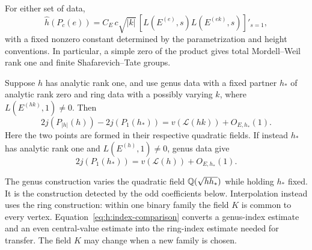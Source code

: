 \begin{proposition}
\label{prop:heegner-comparison}
For either set of data,
\begin{equation}\label{eq:h:height}
 \widehat h(P_c(e))
 =C_E\,c\sqrt{|k|}\,
       \left[L(E^{(e)},s)L(E^{(ek)},s)\right]'_{s=1},
\end{equation}
with a fixed nonzero constant determined by the parametrization and height
conventions. In particular, a simple zero of the product gives total
Mordell--Weil rank one and finite Shafarevich--Tate groups.

Suppose $h$ has analytic rank one, and use genus data with a fixed partner
$h_*$ of analytic rank zero and ring data with a possibly varying $k$,
where $L(E^{(hk)},1)\ne0$. Then
\begin{equation}\label{eq:h:index-comparison}
 2j(P_{|h|}(h))-2j(P_1(h_*))
       =v(\mathcal L(hk))+O_{E,h_*}(1).
\end{equation}
Here the two points are formed in their respective quadratic fields.
If instead $h_*$ has analytic rank one and $L(E^{(h)},1)\ne0$, genus
data give
\begin{equation}\label{eq:h:reverse-comparison}
 2j(P_1(h_*))=v(\mathcal L(h))+O_{E,h_*}(1).
\end{equation}
\end{proposition}


The genus construction varies the quadratic field $\mathbb Q(\sqrt{hh_*})$
while holding $h_*$ fixed. It is the construction detected by the odd
coefficients below. Interpolation instead uses the ring construction:
within one binary family the field $K$ is common to every vertex.
Equation~\eqref{eq:h:index-comparison} converts a genus-index estimate
and an even central-value estimate into the ring-index estimate needed
for transfer. The field $K$ may change when a new family is chosen.

